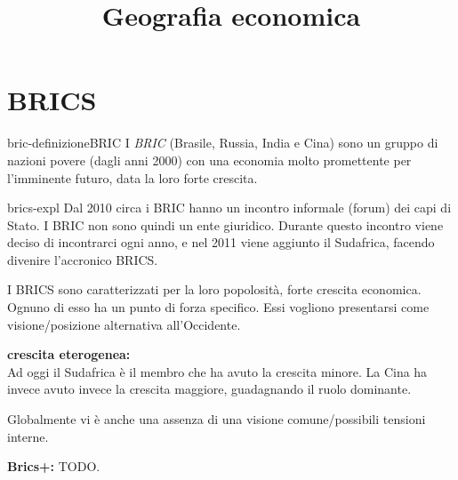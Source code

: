 \documentclass[preview]{standalone}
\begin{document}
\title{Geografia economica}
\genpage

\section{BRICS}

\begin{snippetdefinition}{bric-definizione}{BRIC}
    I \textit{BRIC} (Brasile, Russia, India e Cina)
    sono un gruppo di nazioni povere (dagli anni 2000) con una economia
    molto promettente per l'imminente futuro, data la loro forte crescita. 
\end{snippetdefinition}

\begin{snippet}{brics-expl}
    Dal 2010 circa i BRIC hanno un incontro informale (forum) dei capi di Stato.
    I BRIC non sono quindi un ente giuridico.
    Durante questo incontro viene deciso di incontrarci ogni anno, e nel 2011 viene aggiunto il Sudafrica,
    facendo divenire l'accronico BRICS.
    
    I BRICS sono caratterizzati per la loro popolosità, forte crescita economica.
    Ognuno di esso ha un punto di forza specifico.
    Essi vogliono presentarsi come visione/posizione alternativa all'Occidente.
    
    \textbf{crescita eterogenea:} \\
    Ad oggi il Sudafrica è il membro che ha avuto la crescita minore.
    La Cina ha invece avuto invece la crescita maggiore, guadagnando il ruolo dominante.
    
    Globalmente vi è anche una assenza di una visione comune/possibili tensioni interne.
    
    \textbf{Brics+:} TODO.
\end{snippet}
\end{document}
